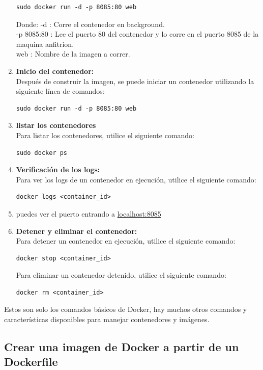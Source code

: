 \documentclass{article}
\begin{document}
\begin{enumerate}
    \begin{lstlisting}[numbers=none]
    sudo docker run -d -p 8085:80 web\end{lstlisting}
    Donde:
    -d : Corre el contenedor en background.\\
    -p 8085:80 : Lee el puerto 80 del contenedor y lo corre en el puerto 8085 de la maquina anfitrion.\\
    web : Nombre de la imagen a correr.
    \item \textbf{Inicio del contenedor:}\\ 
    Después de construir la imagen, se puede iniciar un contenedor utilizando la siguiente línea de comandos:
    \begin{lstlisting}[numbers=none]
    sudo docker run -d -p 8085:80 web\end{lstlisting}
    \item \textbf{listar los contenedores}\\ 
    Para listar los contenedores, utilice el siguiente comando:
    \begin{lstlisting}[numbers=none]
    sudo docker ps\end{lstlisting}
    \item \textbf{Verificación de los logs:}\\
    Para ver los logs de un contenedor en ejecución, utilice el siguiente comando:
    \begin{lstlisting}[numbers=none]
    docker logs <container_id>\end{lstlisting}
    \item puedes ver el puerto entrando a \href{http://localhost:8085/}{localhost:8085}
    \item \textbf{Detener y eliminar el contenedor:}\\ 
    Para detener un contenedor en ejecución, utilice el siguiente comando:
    \begin{lstlisting}[numbers=none]
    docker stop <container_id>\end{lstlisting}
    Para eliminar un contenedor detenido, utilice el siguiente comando:
    \begin{lstlisting}[numbers=none]
    docker rm <container_id>\end{lstlisting}
\end{enumerate}
Estos son solo los comandos básicos de Docker, hay muchos otros comandos y características disponibles para manejar contenedores y imágenes.\\

\subsection{Crear una imagen de Docker a partir de un Dockerfile}
\end{document}
